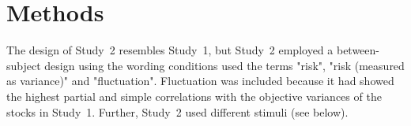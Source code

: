 \documentclass[a4paper,man, natbib,floatsintext]{apa6} %
\begin{document}
\section{Methods}
The design of Study~2 resembles Study~1, but Study~2 employed a between-subject design using the wording conditions used the terms "risk", "risk (measured as variance)" and "fluctuation". Fluctuation was included because it had showed the highest partial and simple correlations with the objective variances of the stocks in Study~1. Further, Study~2 used different stimuli (see below).



\end{document}
